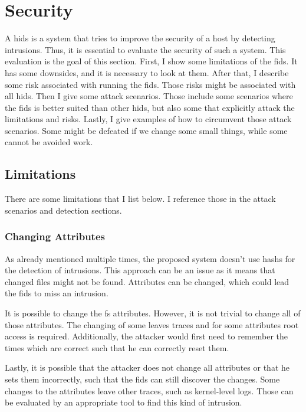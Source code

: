 
\section{Security}
\label{sec:Security}

A \gls{hids} is a system that tries to improve the security of a host by detecting \glspl{intrusion}. Thus, it is essential to evaluate the security of such a system. This evaluation is the goal of this section. First, I show some limitations of the \gls{fids}. It has some downsides, and it is necessary to look at them. After that, I describe some risk associated with running the \gls{fids}. Those risks might be associated with all \gls{hids}. Then I give some attack scenarios. Those include some scenarios where the \gls{fids} is better suited than other \gls{hids}, but also some that explicitly attack the limitations and risks. Lastly, I give examples of how to circumvent those attack scenarios. Some might be defeated if we change some small things, while some cannot be avoided work.

\subsection{Limitations}
\label{sec:Limitations}

There are some limitations that I list below. I reference those in the attack scenarios and detection sections.

\subsubsection{Changing Attributes}
\label{sec:limitation:chattr}

As already mentioned multiple times, the proposed system doesn't use \glspl{hash} for the detection of \glspl{intrusion}. This approach can be an issue as it means that changed files might not be found. Attributes can be changed, which could lead the \gls{fids} to miss an \gls{intrusion}.  \cite{chaning:times, changing:attributes}

It is possible to change the \gls{fs} attributes. However, it is not trivial to change all of those attributes. The changing of some leaves traces and for some attributes root access is required. Additionally, the attacker would first need to remember the times which are correct such that he can correctly reset them. 

Lastly, it is possible that the attacker does not change all attributes or that he sets them incorrectly, such that the \gls{fids} can still discover the changes. Some changes to the attributes leave other traces, such as kernel-level logs. Those can be evaluated by an appropriate tool to find this kind of \gls{intrusion}.

